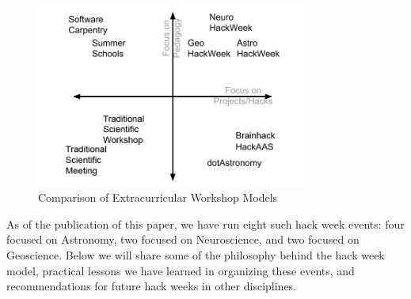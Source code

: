 \begin{figure}
\begin{center}
\includegraphics[width=9cm]{fig/HackSpectrum}
\caption{Comparison of Extracurricular Workshop Models}
\label{fig:hackspectrum}
\end{center}
\end{figure}

As of the publication of this paper, we have run eight such hack week events: four focused on Astronomy, two focused on Neuroscience, and two focused on Geoscience.
Below we will share some of the philosophy behind the hack week model, practical lessons we have learned in organizing these events, and recommendations for future hack weeks in other disciplines.
